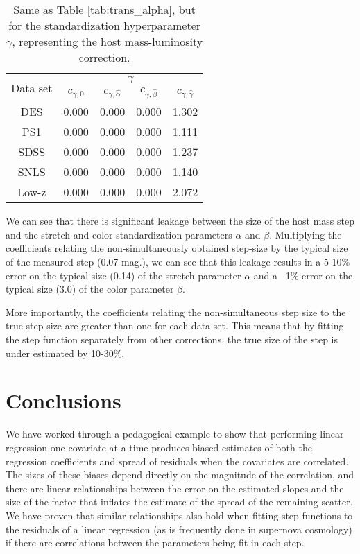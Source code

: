 \begin{table}[htbp]
    \centering
    \begin{tabular}{ccccc}\toprule
        \multirow{2}{*}{Data set} &
        \multicolumn{4}{c}{$\gamma$}\\
        {} &  $c_{\gamma, 0}$ &  $c_{\gamma,\hat{\alpha}}$ & $c_{\gamma,\hat{\beta}}$ & $c_{\gamma,\hat{\gamma}}$ \\\midrule
        DES & 0.000 & 0.000 & 0.000 & 1.302\\
        PS1 & 0.000 & 0.000 & 0.000 & 1.111\\
        SDSS & 0.000 & 0.000 & 0.000 & 1.237\\
        SNLS & 0.000 & 0.000 & 0.000 & 1.140\\
        Low-z & 0.000 & 0.000 & 0.000 & 2.072\\
    \bottomrule
    \end{tabular}
    \caption{Same as Table \ref{tab:trans_alpha}, but for the standardization hyperparameter $\gamma$, representing the host mass-luminosity correction.}
    \label{tab:trans_gamma}
\end{table}

We can see that there is significant leakage between the size of the host mass step and the stretch and color standardization parameters $\alpha$ and $\beta$. Multiplying the coefficients relating the non-simultaneously obtained step-size by the typical size of the measured step (0.07 mag.), we can see that this leakage results in a 5-10\% error on the typical size (0.14) of the stretch parameter $\alpha$ and a ~1\% error on the typical size (3.0) of the color parameter $\beta$.

More importantly, the coefficients relating the non-simultaneous step size to the true step size are greater than one for each data set. This means that by fitting the step function separately from other corrections, the true size of the step is under estimated by 10-30\%.

\section{Conclusions}
\label{sec:conclusion}
We have worked through a pedagogical example to show that performing linear regression one covariate at a time produces biased estimates of both the regression coefficients and spread of residuals when the covariates are correlated. The sizes of these biases depend directly on the magnitude of the correlation, and there are linear relationships between the error on the estimated slopes and the size of the factor that inflates the estimate of the spread of the remaining scatter. We have proven that similar relationships also hold when fitting step functions to the residuals of a linear regression (as is frequently done in supernova cosmology) if there are correlations between the parameters being fit in each step. 

